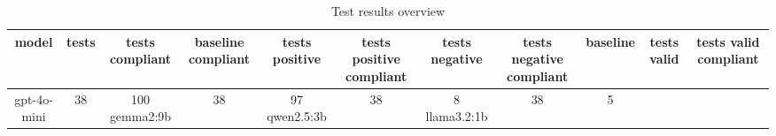 
  \begin{table}[h!]
  \centering
  \begin{tabular}{|c|c|c|c|c|c|c|c|c|c|c|}
  \hline
  model & tests & tests compliant & baseline compliant & tests positive & tests positive compliant & tests negative & tests negative compliant & baseline & tests valid & tests valid compliant \\
  \hline
  gpt-4o-mini & 38 & 100%
\hline
gemma2:9b & 38 & 97%
\hline
qwen2.5:3b & 38 & 8%
\hline
llama3.2:1b & 38 & 5%
  \end{tabular}
  \caption{Test results overview}
  
  \end{table}
  